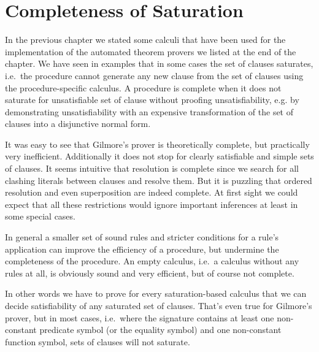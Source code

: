 
\chapter{Completeness of Saturation}\label{chapter:completeness}

In the previous chapter we stated some calculi
that have been used for the implementation
of the automated theorem provers we listed at the end of the chapter.
We have seen in examples that in some cases the set of clauses
saturates, i.e.~the procedure cannot generate any new clause
from the set of clauses using the procedure-specific calculus. 
A procedure is complete when it does not saturate for unsatisfiable 
set of clause without proofing unsatisfiability, 
e.g. by demonstrating unsatisfiability 
with an expensive transformation of the set of clauses 
into a disjunctive normal form.

It was easy to see that Gilmore's prover is theoretically complete,
but practically very inefficient.
Additionally it does not stop for clearly satisfiable and simple sets of clauses.
It seems intuitive that resolution is complete since
we search for all clashing literals between clauses and resolve them.
But it is puzzling that ordered resolution 
and even superposition are indeed complete.
At first sight we could expect that all these restrictions
would ignore important inferences at least in some special cases.

In general a smaller set of sound rules
and stricter conditions for a rule's application
can improve the efficiency of a procedure,
but undermine the completeness
of the procedure. An empty calculus,
i.e.~a calculus without any rules at all,
is obviously sound and very efficient, 
but of course not complete.

In other words we have to prove for every saturation-based calculus
that we can decide satisfiability of any saturated set of clauses.
That's even true for Gilmore's prover, but in most cases, 
i.e.~where
the signature contains at least one non-constant predicate symbol
(or the equality symbol)
and one non-constant function symbol,
sets of clauses will not saturate.



